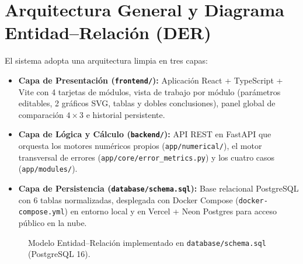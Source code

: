 \documentclass[11pt,a4paper]{article}
\begin{document}
\section{Arquitectura General y Diagrama Entidad--Relación (DER)}
El sistema adopta una arquitectura limpia en tres capas:
\begin{itemize}[noitemsep]
    \item \textbf{Capa de Presentación (\texttt{frontend/}):} Aplicación React + TypeScript + Vite con 4 tarjetas de módulos, vista de trabajo por módulo (parámetros editables, 2 gráficos SVG, tablas y dobles conclusiones), panel global de comparación $4\times 3$ e historial persistente.
    \item \textbf{Capa de Lógica y Cálculo (\texttt{backend/}):} API REST en FastAPI que orquesta los motores numéricos propios (\texttt{app/numerical/}), el motor transversal de errores (\texttt{app/core/error\_metrics.py}) y los cuatro casos (\texttt{app/modules/}).
    \item \textbf{Capa de Persistencia (\texttt{database/schema.sql}):} Base relacional PostgreSQL con 6 tablas normalizadas, desplegada con Docker Compose (\texttt{docker-compose.yml}) en entorno local y en Vercel + Neon Postgres para acceso público en la nube.
\end{itemize}

\begin{figure}[h!]
\centering
{}
\caption{Modelo Entidad--Relación implementado en \texttt{database/schema.sql} (PostgreSQL 16).}
\end{figure}
\end{document}
